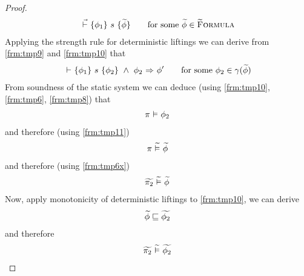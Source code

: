 \begin{proof}
    \begin{align}
    \label{frm:tmp10}
    {} \,\,\vec{\vdash}\,\, \{{\phi_1}\} ~{s}~ \{{\widetilde{\phi}}\}
    \quad\quad\text{for some } \widetilde{\phi} \in \textup{\textsc{\ensuremath{\widetilde{\text{F}}}ormula}}
    \end{align}
    Applying the strength rule for deterministic liftings we can derive from \ref{frm:tmp9} and \ref{frm:tmp10} that
    \begin{align}
    \label{frm:tmp11}
    {} \,\,{\vdash}\,\, \{{\phi_1}\} ~{s}~ \{{\phi_2}\} ~\wedge~ {\phi_2} \,\,{\Rightarrow}\,\, {\phi'}
    \quad\quad\text{for some } \phi_2 \in \gamma(\widetilde{\phi})
    \end{align}
    From soundness of the static system we can deduce (using \ref{frm:tmp10}, \ref{frm:tmp6}, \ref{frm:tmp8}) that
    \begin{align}
    \label{frm:tmp12}
    \pi \,\,{\vDash}\,\, \phi_2
    \end{align}
    and therefore (using \ref{frm:tmp11})
    \begin{align}
    \label{frm:tmp13}
    \pi \,\,\widetilde{\vDash}\,\, \widetilde{\phi}
    \end{align}
    and therefore (using \ref{frm:tmp6x})
    \begin{align}
    \label{frm:tmp14}
    \widetilde{\pi_2} \,\,\widetilde{\vDash}\,\, \widetilde{\phi}
    \end{align}
    Now, apply monotonicity of deterministic liftings to \ref{frm:tmp10}, we can derive
    \begin{align}
    \label{frm:tmp15}
    \widetilde{\phi} \sqsubseteq \widetilde{\phi_2}
    \end{align}
    and therefore
    \begin{align}
    \label{frm:tmp16}
    \widetilde{\pi_2} \,\,\widetilde{\vDash}\,\, \widetilde{\phi_2}
    \end{align}
\end{proof}
 
